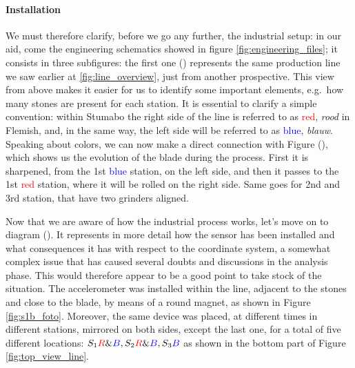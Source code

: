 \paragraph{Installation} We must therefore clarify, before we go any further, the industrial setup: in our aid, come the engineering schematics showed in figure \ref{fig:engineering_files};
it consists in three subfigures: the first one () represents the same production line we saw earlier at \ref{fig:line_overview}, just from another prospective. 
This view from above makes it easier for us to identify some important elements, e.g.\ how many stones are present for each station.
It is essential to clarify a simple convention: within Stumabo the right side of the line is referred to as \textcolor{red}{red}, \textit{rood} in Flemish, and, in the same way, 
the left side will be referred to as \textcolor{blue}{blue}, \textit{blauw}. 
Speaking about colors, we can now make a direct connection with Figure (), which shows us the evolution of the blade during the process.
First it is sharpened, from the 1st \textcolor{blue}{blue} station, on the left side, and then it passes to the 1st \textcolor{red}{red} station, where it will be rolled on the right side. 
Same goes for 2nd and 3rd station, that have two grinders aligned. 

Now that we are aware of how the industrial process works, let's move on to diagram ().
It represents in more detail how the sensor has been installed and what consequences it has with respect to the coordinate system, 
a somewhat complex issue that has caused several doubts and discussions in the analysis phase. This would therefore appear to be a good point to take stock of the situation.
The accelerometer was installed within the line, adjacent to the stones and close to the blade, by means of a round magnet, as shown in Figure \ref{fig:s1b_foto}.
Moreover, the same device was placed, at different times in different stations, mirrored on both sides, except the last one, for a total of five different locations: 
${S_{1}\textcolor{red}{R}\&\textcolor{blue}{B}, S_{2}\textcolor{red}{R}\&\textcolor{blue}{B}, S_{3}\textcolor{blue}{B}}$ as shown in the bottom part of Figure \ref{fig:top_view_line}.

